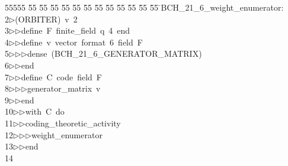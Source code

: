 %
%
\begin{tabbing}
55555 \= 55 \= 55 \= 55 \= 55 \= 55 \= 55 \= 55 \= 55 \= 55 \= 55 \= 55 \= 55 \= \>BCH\_21\_6\_weight\_enumerator:\\[0pt]
2\>$\triangleright$\>(ORBITER)\ v\ 2\ \\[0pt]
3\>$\triangleright$\>$\triangleright$\>define\ F\ finite\_field\ q\ 4\ end\ \\[0pt]
4\>$\triangleright$\>$\triangleright$\>define\ v\ vector\ format\ 6\ field\ F\ \\[0pt]
5\>$\triangleright$\>$\triangleright$\>$\triangleright$\>dense\ (BCH\_21\_6\_GENERATOR\_MATRIX)\ \\[0pt]
6\>$\triangleright$\>$\triangleright$\>end\ \\[0pt]
7\>$\triangleright$\>$\triangleright$\>define\ C\ code\ field\ F\ \\[0pt]
8\>$\triangleright$\>$\triangleright$\>$\triangleright$\>generator\_matrix\ v\ \\[0pt]
9\>$\triangleright$\>$\triangleright$\>end\ \\[0pt]
10\>$\triangleright$\>$\triangleright$\>with\ C\ do\ \\[0pt]
11\>$\triangleright$\>$\triangleright$\>coding\_theoretic\_activity\ \\[0pt]
12\>$\triangleright$\>$\triangleright$\>$\triangleright$\>weight\_enumerator\ \\[0pt]
13\>$\triangleright$\>$\triangleright$\>end\\[0pt]
14\>\end{tabbing}
